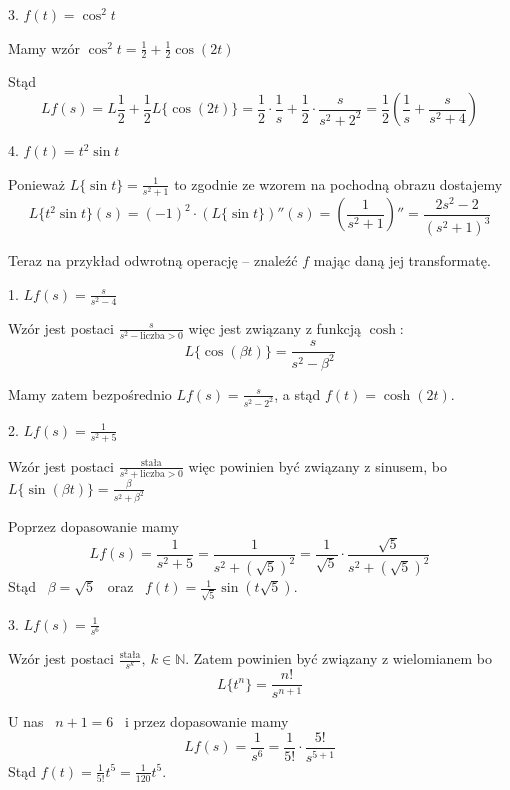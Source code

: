 \begin{przyklad}
    3. $ f(t) = \cos^2 t $
    
    Mamy wzór $ \cos^2 t = \frac{1}{2} + \frac{1}{2} \cos(2t) $

    Stąd 
    \[ Lf(s) = L \frac{1}{2} + \frac{1}{2}L \{ \cos(2t) \} = \frac{1}{2} \cdot \frac{1}{s} + \frac{1}{2} \cdot \frac{s}{s^2 + 2^2} = \frac{1}{2} \left( \frac{1}{s} + \frac{s}{s^2 + 4} \right) \]
\end{przyklad}

\begin{przyklad}
    4. $ f(t) = t^2 \sin t $

    Ponieważ $ L \{ \sin t \} = \frac{1}{s^2 + 1} $ to zgodnie ze wzorem na pochodną obrazu dostajemy
    \[ L \{ t^2 \sin t \}(s) = (-1)^2 \cdot (L \{ \sin t \})'' (s) = \left( \frac{1}{s^2 + 1} \right)'' = \frac{2s^2 - 2}{(s^2 + 1)^3} \]
\end{przyklad}
\bigskip

Teraz na przykład odwrotną operację -- znaleźć $f$ mając daną jej transformatę.

\begin{przyklad}
    1. $ Lf(s) = \frac{s}{s^2 - 4} $

    Wzór jest postaci $ \frac{s}{s^2 - \text{liczba} > 0} $ więc jest związany z funkcją $\cosh$:
    \[ L \{ \cos (\beta t) \} = \frac{s}{s^2 - \beta^2} \]

    Mamy zatem bezpośrednio $ Lf(s) = \frac{s}{s^2 - 2^2} $, a stąd $ f(t) = \cosh(2t) $.
\end{przyklad}

\begin{przyklad}
    2. $ Lf(s) = \frac{1}{s^2 + 5} $

    Wzór jest postaci $ \frac{\text{stała}}{s^2 + \text{liczba} > 0} $ więc powinien być związany z sinusem, bo $ L\{ \sin (\beta t) \} = \frac{\beta}{s^2 + \beta^2} $

    Poprzez dopasowanie mamy
    \[ Lf(s) = \frac{1}{s^2 + 5} = \frac{1}{s^2 + (\sqrt{5})^2} = \frac{1}{\sqrt{5}} \cdot \frac{\sqrt{5}}{s^2 + (\sqrt{5})^2} \]
    Stąd \ $ \beta = \sqrt{5} $ \ oraz \ $ f(t) = \frac{1}{\sqrt{5}} \sin(t \sqrt{5}) $.
\end{przyklad}

\begin{przyklad}
    3. $ Lf(s) = \frac{1}{s^6} $

    Wzór jest postaci $ \frac{\text{stała}}{s^k}, \ k \in \mathbb{N} $. Zatem powinien być związany z wielomianem bo
    \[ L \{ t^n \} = \frac{n!}{s^{n + 1}} \]
    
    U nas \ $ n + 1 = 6 $ \ i przez dopasowanie mamy
    \[ Lf(s) = \frac{1}{s^6} = \frac{1}{5!} \cdot \frac{5!}{s^{5 + 1}} \]
    Stąd $ f(t) = \frac{1}{5!} t^5 = \frac{1}{120} t^5 $.
\end{przyklad}

